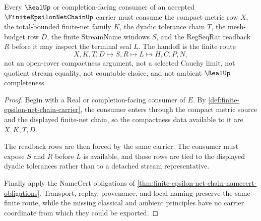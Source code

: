 \begin{theorem}
\label{thm:finite-epsilon-net-chain-real-completion-handoff}
Every $\RealUp$ or completion-facing consumer of an accepted $\FiniteEpsilonNetChainUp$ carrier must consume the compact-metric row $X$, the total-bounded finite-net family $K$, the dyadic tolerance chain $T$, the mesh-budget row $D$, the finite StreamName windows $S$, and the RegSeqRat readback $R$ before it may inspect the terminal seal $L$. The handoff is the finite route
$$
X,K,T,D \longmapsto S,R \longmapsto L \longmapsto H,C,P,N ,
$$
not an open-cover compactness argument, not a selected Cauchy limit, not quotient stream equality, not countable choice, and not ambient $\RealUp$ completeness.
\end{theorem}
\begin{proof}
Begin with a Real or completion-facing consumer of $E$. By \autoref{def:finite-epsilon-net-chain-carrier}, the consumer enters through the compact metric source and the displayed finite-net chain, so the compactness data available to it are $X,K,T,D$.

The readback rows are then forced by the same carrier. The consumer must expose $S$ and $R$ before $L$ is available, and those rows are tied to the displayed dyadic tolerances rather than to a detached stream representative.

Finally apply the NameCert obligations of \autoref{thm:finite-epsilon-net-chain-namecert-obligations}. Transport, replay, provenance, and local naming preserve the same finite route, while the missing classical and ambient principles have no carrier coordinate from which they could be exported.
\end{proof}


\begin{closurestatus}{\FiniteEpsilonNetChainUp}
  \theoryclosure{\seedClosure}
  \formalstatus{\unformalizedV}
\end{closurestatus}

